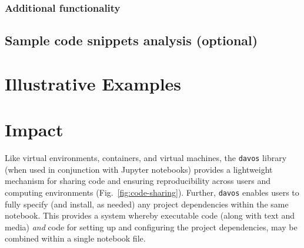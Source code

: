\documentclass[preprint,12pt, a4paper]{elsarticle}
\begin{document}
\subsubsection{Additional functionality}



\subsection{Sample code snippets analysis (optional)}


\section{Illustrative Examples}



\section{Impact}

Like virtual environments, containers, and virtual machines, the
\texttt{davos} library (when used in conjunction with Jupyter
notebooks) provides a lightweight mechanism for sharing code and
ensuring reproducibility across users and computing environments
(Fig.~\ref{fig:code-sharing}).  Further, \texttt{davos} enables users
to fully specify (and install, as needed) any project dependencies
within the same notebook.  This provides a system whereby executable
code (along with text and media) \textit{and} code for setting up and
configuring the project dependencies, may be combined within a single
notebook file.
\end{document}
